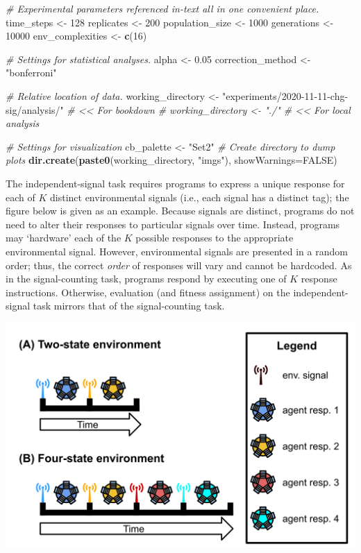 \documentclass[]{book}
\newenvironment{Shaded}{\begin{snugshade}}{\end{snugshade}}
\newcommand{\CommentTok}[1]{\textcolor[rgb]{0.56,0.35,0.01}{\textit{#1}}}
\newcommand{\DataTypeTok}[1]{\textcolor[rgb]{0.13,0.29,0.53}{#1}}
\newcommand{\DecValTok}[1]{\textcolor[rgb]{0.00,0.00,0.81}{#1}}
\newcommand{\FloatTok}[1]{\textcolor[rgb]{0.00,0.00,0.81}{#1}}
\newcommand{\KeywordTok}[1]{\textcolor[rgb]{0.13,0.29,0.53}{\textbf{#1}}}
\newcommand{\NormalTok}[1]{#1}
\newcommand{\OtherTok}[1]{\textcolor[rgb]{0.56,0.35,0.01}{#1}}
\newcommand{\StringTok}[1]{\textcolor[rgb]{0.31,0.60,0.02}{#1}}
\begin{document}
\begin{Shaded}
\begin{Highlighting}[]
\CommentTok{# Experimental parameters referenced in-text all in one convenient place.}
\NormalTok{time_steps <-}\StringTok{ }\DecValTok{128}
\NormalTok{replicates <-}\StringTok{ }\DecValTok{200}
\NormalTok{population_size <-}\StringTok{ }\DecValTok{1000}
\NormalTok{generations <-}\StringTok{ }\DecValTok{10000}
\NormalTok{env_complexities <-}\StringTok{ }\KeywordTok{c}\NormalTok{(}\DecValTok{16}\NormalTok{)}

\CommentTok{# Settings for statistical analyses.}
\NormalTok{alpha <-}\StringTok{ }\FloatTok{0.05}
\NormalTok{correction_method <-}\StringTok{ "bonferroni"}

\CommentTok{# Relative location of data.}
\NormalTok{working_directory <-}\StringTok{ "experiments/2020-11-11-chg-sig/analysis/"} \CommentTok{# << For bookdown}
\CommentTok{# working_directory <- "./"                                     # << For local analysis}

\CommentTok{# Settings for visualization}
\NormalTok{cb_palette <-}\StringTok{ "Set2"}
\CommentTok{# Create directory to dump plots}
\KeywordTok{dir.create}\NormalTok{(}\KeywordTok{paste0}\NormalTok{(working_directory, }\StringTok{"imgs"}\NormalTok{), }\DataTypeTok{showWarnings=}\OtherTok{FALSE}\NormalTok{)}
\end{Highlighting}
\end{Shaded}

The independent-signal task requires programs to express a unique response for each of \(K\) distinct environmental signals (i.e., each signal has a distinct tag); the figure below is given as an example.
Because signals are distinct, programs do not need to alter their responses to particular signals over time.
Instead, programs may `hardware' each of the \(K\) possible responses to the appropriate environmental signal.
However, environmental signals are presented in a random order; thus, the correct \emph{order} of responses will vary and cannot be hardcoded.
As in the signal-counting task, programs respond by executing one of \(K\) response instructions.
Otherwise, evaluation (and fitness assignment) on the independent-signal task mirrors that of the signal-counting task.

\includegraphics{experiments/2020-11-11-chg-sig/analysis/../../../media/independent-signal-task.png}
\end{document}

